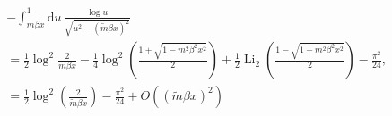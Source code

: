 \documentclass[a4paper,11pt]{article}
\newcommand{\e}{\mathrm e}
\newcommand{\dd}{\mathrm d}
\newcommand{\Li}{\operatorname{Li}}
\newcommand{\Order}{\mathcal O}
\begin{document}
\begin{align}
&	-\int_{\tilde m\beta x}^{1}\dd u\,
	\frac{\log u}{\sqrt{u^2-(\tilde m\beta x)^2}}\nonumber
\\&	=
	\frac12\log^2\!\frac{2}{m\beta x}
	-\frac14
	\log^2\!\left(
	\frac{1+\sqrt{1-m^2\beta^2x^2}}{2}
	\right)
	+\frac12\Li_2\!\left(
	\frac{1-\sqrt{1-m^2\beta^2x^2}}{2}
	\right)
	-\frac{\pi^2}{24},\nonumber\\
	&=\frac{1}{2}\log^2(\frac2{\tilde{m}\beta x})-\frac{\pi^2}{24}+O((\tilde m\beta x)^2)
	\label{eq:BP-log-singular}
\end{align}
\end{document}
